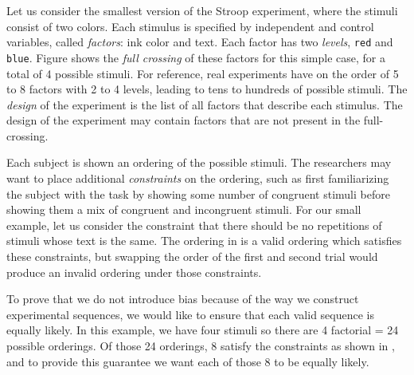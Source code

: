 Let us consider the smallest version of the Stroop experiment, where the stimuli consist of two colors. Each stimulus is specified by independent and control variables, called \emph{factors}: ink color and text. Each factor has two \emph{levels}, \texttt{red} and \texttt{blue}. Figure  shows the \emph{full crossing} of these factors for this simple case, for a total of 4 possible stimuli. For reference, real experiments have on the order of 5 to 8 factors with 2 to 4 levels, leading to tens to hundreds of possible stimuli. The \emph{design} of the experiment is the list of all factors that describe each stimulus. The design of the experiment may contain factors that are not present in the full-crossing.

Each subject is shown an ordering of the possible stimuli. The researchers may want to place additional \emph{constraints} on the ordering, such as first familiarizing the subject with the task by showing some number of congruent stimuli before showing them a mix of congruent and incongruent stimuli. For our small example, let us consider the constraint that there should be no repetitions of stimuli whose text is the same. The ordering in  is a valid ordering which satisfies these constraints, but swapping the order of the first and second trial would produce an invalid ordering under those constraints.

To prove that we do not introduce bias because of the way we construct experimental sequences, we would like to ensure that each valid sequence is equally likely. In this example, we have four stimuli so there are 4 factorial = 24 possible orderings. Of those 24 orderings, 8 satisfy the constraints as shown in , and to provide this guarantee we want each of those 8 to be equally likely.


